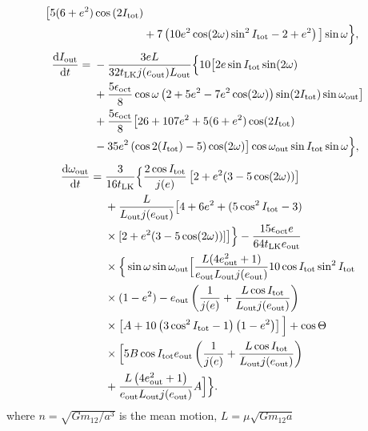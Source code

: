 \documentclass[10pt,
        twocolumn,
        fleqn,
    ]{revtex4-2}%
\newcommand*{\rd}[2]{\frac{\mathrm{d}#1}{\mathrm{d}#2}}
\newcommand*{\p}[1]{\left(#1\right)}
\newcommand*{\s}[1]{\left[#1\right]}
\begin{document}
{\begin{align}
            \big[5(6 + e^2)\cos \p{2I_{\rm tot}}\nonumber\\
        &+ 7\p{10e^2 \cos (2\omega) \sin^2 I_{\rm tot} - 2 + e^2}\big]
            \sin \omega\Big\},
\end{align}
\begin{align}
    \rd{I_{\rm out}}{t} ={}& -\frac{3eL}{32t_{\rm LK}j(e_{\rm out}) L_{\rm out}}
            \Big\{ 10\big[2e \sin I_{\rm tot} \sin (2\omega)\nonumber\\
        &+ \frac{5\epsilon_{\rm oct}}{8}\cos \omega\p{
            2 + 5e^2 - 7e^2\cos (2\omega)}\sin (2I_{\rm tot})\sin \omega_{\rm
            out}\big]\nonumber\\
        &+ \frac{5\epsilon_{\rm oct}}{8}\big[26 + 107e^2
            + 5(6 + e^2)\cos(2I_{\rm tot})\nonumber\\
        &- 35 e^2\p{\cos 2(I_{\rm tot}) - 5} \cos (2\omega)\big]
            \cos \omega_{\rm out}\sin I_{\rm tot} \sin \omega\Big\},
\end{align}
\begin{align}
    \rd{\omega_{\rm out}}{t} ={}&
        \frac{3}{16t_{\rm LK}}\Big\{\frac{2\cos I_{\rm tot}}{j(e)}
            \s{2 + e^2(3 - 5\cos(2\omega))}\nonumber\\
        &+ \frac{L}{L_{\rm out}j(e_{\rm out})}\big[4 + 6e^2
            + (5\cos^2 I_{\rm tot} - 3)\nonumber\\
        &\times [2 + e^2(3 - 5\cos(2\omega))]\big]\Big\}
            - \frac{15 \epsilon_{\rm oct}e}{64t_{\rm LK}e_{\rm out}}\nonumber\\
        &\times \Big\{ \sin \omega \sin \omega_{\rm out}\Big[
            \frac{L(4e_{\rm out}^2 + 1)}{e_{\rm out}L_{\rm out} j(e_{\rm out})}
            10 \cos I_{\rm tot}\sin^2 I_{\rm tot}\nonumber\\
        &\times(1 - e^2) - e_{\rm out}\p{\frac{1}{j(e)} +
            \frac{L \cos I_{\rm tot}}{L_{\rm out}j(e_{\rm out})}}\nonumber\\
        &\times\s{A + 10\p{3\cos^2 I_{\rm tot} - 1}\p{1 - e^2}}\Big]
            + \cos \Theta\nonumber\\
        &\times \Big[5B\cos I_{\rm tot}e_{\rm out}\p{\frac{1}{j(e)} +
            \frac{L \cos I_{\rm tot}}{L_{\rm out}j(e_{\rm out})}}\nonumber\\
        &+ \frac{L\p{4e_{\rm out}^2 + 1}}{e_{\rm out}L_{\rm out}j(e_{\rm out})}
            A\Big]\Big\}.
\end{align}
}
where $n = \sqrt{Gm_{12} / a^3}$ is the mean motion, $L = \mu \sqrt{Gm_{12}a}$
\end{document}

